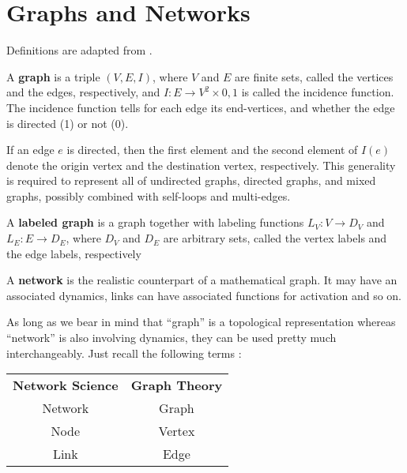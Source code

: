\tocless\section{Graphs and Networks}
\label{sec:graphs}
Definitions are adapted from \textcite{gross2005graph,boccaletti2006complex}.

\begin{definition}
	A \textbf{graph} is a triple $(V,E,I)$, where $V$ and $E$ are finite sets, called the vertices and the edges, respectively, and $I:E\to V^2×{0,1}$ is called the incidence function. The incidence function tells for each edge its end-vertices, and whether the edge is directed (1) or not (0). 
\end{definition}
If an edge $e$ is directed, then the first element and the second element of $I(e)$ denote the origin vertex and the destination vertex, respectively. This generality is required to represent all of undirected graphs, directed graphs, and mixed graphs, possibly combined with self-loops and multi-edges.

\begin{definition}
	A \textbf{labeled graph} is a graph together with labeling functions $L_V:V \rightarrow D_V$ and $L_E:E \rightarrow D_E$, where $D_V$ and $D_E$ are arbitrary sets, called the vertex labels and the edge labels, respectively
\end{definition}

\begin{definition}
	A \textbf{network} is the realistic counterpart of a mathematical graph. It may have an associated dynamics, links can have associated functions for activation and so on. 
\end{definition}
As long as we bear in mind that ``graph'' is a topological representation whereas ``network'' is also involving dynamics, they can be used pretty much interchangeably. Just recall the following terms \citep{barabasi2016network}:

\begin{table}[h!]
	\centering
	\begin{tabular}{c|c }
		\textbf{Network Science} & \textbf{Graph Theory}   \\ \cline{1-2}
		Network                  & Graph                  \\ 
		Node                     & Vertex                  \\
		Link                     & Edge                    \\
	\end{tabular}
\end{table}



